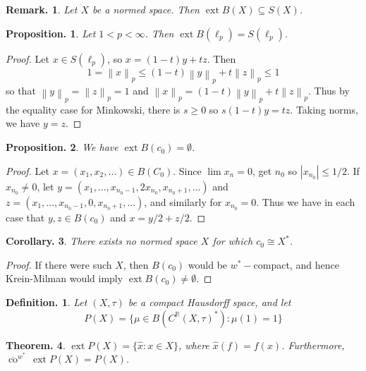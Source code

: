 \documentclass[11pt, a4paper]{memoir}
\DeclareMathOperator{\R}{{\mathbb{R}}}
\newcommand{\norm}[1]{\ensuremath{\left\lVert#1\right\rVert}}
\theoremstyle{change}
\newtheorem{theorem}{Theorem.}[section]
\newtheorem{corollary}[theorem]{Corollary.}
\newtheorem{proposition}[theorem]{Proposition.}
\theoremstyle{plain}
\theoremstyle{nonumberplain}
\newtheorem{definition}{Definition.}
\newtheorem{remark}{Remark.}
\newtheorem{proof}{Proof}
\DeclareMathOperator{\ext}{ext}
\newcommand{\cwx}{\ensuremath{\overline{\operatorname{co}}^{w^*}\,}}
\numberwithin{equation}{section}
\begin{document}
\begin{remark}
    Let $X$ be a normed space.
    Then $\ext B(X)\subseteq S(X)$.
\end{remark}
\begin{proposition}
    Let $1<p<\infty$.
    Then $\ext B(\ell_p)=S(\ell_p)$.
\end{proposition}
\begin{proof}
    Let $x\in S(\ell_p)$, so $x=(1-t)y+tz$.
    Then
    \begin{equation*}
        1=\norm{x}_p\leq(1-t)\norm{y}_p+t\norm{z}_p\leq 1
    \end{equation*}
    so that $\norm{y}_p=\norm{z}_p=1$ and $\norm{x}_p=(1-t)\norm{y}_p+t\norm{z}_p$.
    Thus by the equality case for Minkowski, there is $s\geq 0$ so $s(1-t)y=tz$.
    Taking norms, we have $y=z$.
\end{proof}
\begin{proposition}
    We have $\ext B(c_0)=\emptyset$.
\end{proposition}
\begin{proof}
    Let $x=(x_1,x_2,\ldots)\in B(C_0)$.
    Since $\lim x_n=0$, get $n_0$ so $|x_{n_0}|\leq 1/2$.
    If $x_{n_0}\neq 0$, let $y=(x_1,\ldots,x_{n_0-1},2x_{n_0},x_{n_0+1},\ldots)$ and $z=(x_1,\ldots,x_{n_0-1},0,x_{n_0+1},\ldots)$, and similarly for $x_{n_0}=0$.
    Thus we have in each case that $y,z\in B(c_0)$ and $x=y/2+z/2$.
\end{proof}
\begin{corollary}
    There exists no normed space $X$ for which $c_0\cong X^*$.
\end{corollary}
\begin{proof}
    If there were such $X$, then $B(c_0)$ would be $w^*-$compact, and hence Krein-Milman would imply $\ext B(c_0)\neq\emptyset$.
\end{proof}
\begin{definition}
    Let $(X,\tau)$ be a compact Hausdorff space, and let
    \begin{equation*}
        P(X)=\{\mu\in B(C^{\R}(X,\tau)^*):\mu(1)=1\}
    \end{equation*}
\end{definition}
\begin{theorem}
    $\ext P(X)=\{\hat x:x\in X\}$, where $\hat x(f)=f(x)$.
    Furthermore, $\cwx\ext P(X)=P(X)$.
\end{theorem}
\end{document}
